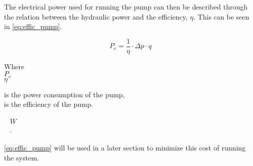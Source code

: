 The electrical power used for running the pump can then be described through the relation between the hydraulic power and the efficiency, $\eta$. This can be seen in \eqref{eq:effic_pump}.

\begin{equation}
P_e = \frac{1}{\eta}\cdot\Delta p \cdot q 
\label{eq:effic_pump}
\end{equation}

\begin{minipage}[t]{0.20\textwidth}
Where\\
\hspace*{8mm} $P_e$\\
\hspace*{8mm} $\eta$
\end{minipage}
\begin{minipage}[t]{0.68\textwidth}
\vspace*{2mm}
is the power consumption of the pump,\\
is the efficiency of the pump.
\end{minipage}
\begin{minipage}[t]{0.10\textwidth}
\vspace*{2mm}
\textcolor{White}{te}$\unit{W}$\\
\textcolor{White}{te}$\unit{\cdot}$\\
\end{minipage}	

\eqref{eq:effic_pump} will be used in a later section to minimize this cost of running the system. 






